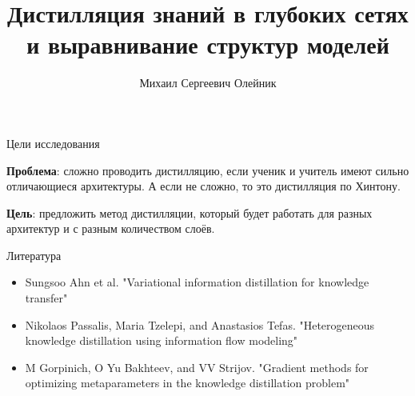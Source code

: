 \documentclass{beamer}
\title[\hbox to 56mm{Дистилляция знаний в глубоких сетях}]{Дистилляция знаний в глубоких сетях и выравнивание структур моделей}
\author[М.\,С.~Олейник]{Михаил Сергеевич Олейник}
\institute{Московский физико-технический институт}
\date{\footnotesize
\par\smallskip\emph{Курс:} Моя первая научная статья
\par\smallskip\emph{Эксперт:} О. Ю. Бахтеев
\par\smallskip\emph{Консультант:} М. Горпинич
\par\bigskip\small 2023}
\begin{document}

\begin{frame}

    \thispagestyle{empty}
    \maketitle

\end{frame}


\begin{frame}{Цели исследования}

    \textbf{Проблема}: сложно проводить дистилляцию, если ученик и учитель имеют сильно отличающиеся архитектуры.
    А если не сложно, то это дистилляция по Хинтону.

    \bigskip

    \textbf{Цель}: предложить метод дистилляции, который будет работать для разных архитектур и с разным количеством слоёв.

\end{frame}


\begin{frame}{Литература}
    \begin{itemize}
        \item Sungsoo Ahn et al. "Variational information distillation for knowledge transfer"
        \item Nikolaos Passalis, Maria Tzelepi, and Anastasios Tefas. "Heterogeneous knowledge distillation using
              information flow modeling"
        \item M Gorpinich, O Yu Bakhteev, and VV Strijov. "Gradient methods for optimizing metaparameters in the
              knowledge distillation problem"
    \end{itemize}
\end{frame}

\end{document}
